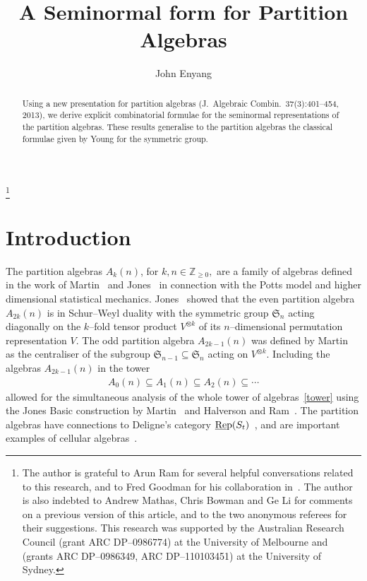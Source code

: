 \documentclass[11pt,a4paper,reqno,svgnames]{amsart}
\theoremstyle{plain}
\theoremstyle{definition}
\numberwithin{equation}{section}
\begin{document}
\title[Partition Algebras]
{A Seminormal form for Partition Algebras}

\author[J. Enyang]{John Enyang}
\address{Department of Mathematics and Statistics, University of Melbourne, Parkville VIC 3010, Australia}


\begin{abstract}
Using a new presentation for partition algebras (J.~Algebraic Combin.~37(3):401--454, 2013), we derive explicit combinatorial formulae for the seminormal representations of the partition algebras. These results generalise to the partition algebras the classical formulae given by Young for the symmetric group. 
\end{abstract}

\thanks{The author is grateful to Arun Ram for several helpful conversations related to this research, and to Fred Goodman for his collaboration in~\cite{EG:2012}. The author is also indebted to Andrew Mathas, Chris Bowman and Ge Li for comments on a previous version of this article, and to the two anonymous referees for their suggestions. This research was supported by the Australian Research Council (grant ARC DP--0986774) at the University of Melbourne and (grants ARC DP--0986349, ARC DP--110103451) at the University of Sydney.}

\maketitle

\section{Introduction}
The partition algebras $A_k(n)$, for $k,n\in\mathbb{Z}_{{\geqslant}0},$ are a family of algebras defined in the work of Martin~\cite{MR1103994, MR1265453, MR1768036} and Jones~\cite{MR1317365} in connection with the Potts model and higher dimensional statistical mechanics. Jones~\cite{MR1317365} showed that the even partition algebra $A_{2k}(n)$ is in Schur--Weyl duality with the symmetric group $\mathfrak{S}_n$ acting diagonally on the $k$--fold tensor product $V^{\otimes k}$ of its $n$--dimensional permutation representation $V$. The odd partition algebra $A_{2k-1}(n)$ was defined by Martin~\cite{MR1768036} as the centraliser of the subgroup $\mathfrak{S}_{n-1}\subseteq \mathfrak{S}_n$ acting on $V^{\otimes k}$. Including the  algebras $A_{2k-1}(n)$ in the tower 
\begin{align}\label{tower}
A_0(n)\subseteq A_1(n)\subseteq A_{2}(n)\subseteq \cdots 
\end{align}
allowed for the simultaneous analysis of the whole tower of algebras~\eqref{tower} using the Jones Basic construction by Martin~\cite{MR1768036} and Halverson and Ram~\cite{MR2143201}. The partition algebras have connections to Deligne's category $\underline{\rm{Re}}{\rm{p}}(S_t)$~\cite{MR2737787}, and are important examples of cellular algebras~\cite{MR1711582, MR1779601, MR2794027}. 
\end{document}
